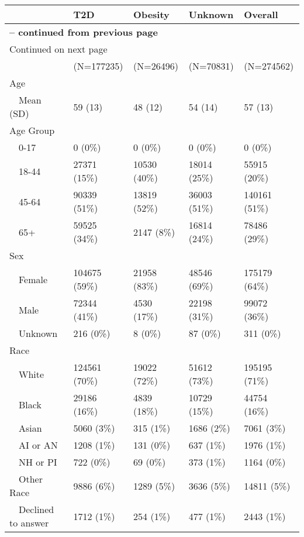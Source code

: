 \begin{longtable}{p{}p{}p{}p{}p{}}
   & T2D & Obesity & Unknown & Overall \\ 
  \hline 
\endfirsthead 
\multicolumn{5}{p{\textwidth}}{{ \bfseries \tablename \thetable{} -- continued from previous page}} \ 
\hline Feature & Type II Diabetes & Obesity & Unknown & Overall\\ \hline 
\endhead 
\hline \multicolumn{5}{p{\textwidth}}{{Continued on next page}} \\ \hline 
\endfoot 
\hline 
\endlastfoot 
 \hline
 & (N=177235) & (N=26496) & (N=70831) & (N=274562) \\ 
  Age &  &  &  &  \\ 
    Mean (SD) & 59 (13) & 48 (12) & 54 (14) & 57 (13) \\ 
  Age Group &  &  &  &  \\ 
    0-17 & 0 (0\%) & 0 (0\%) & 0 (0\%) & 0 (0\%) \\ 
    18-44 & 27371 (15\%) & 10530 (40\%) & 18014 (25\%) & 55915 (20\%) \\ 
    45-64 & 90339 (51\%) & 13819 (52\%) & 36003 (51\%) & 140161 (51\%) \\ 
    65+ & 59525 (34\%) & 2147 (8\%) & 16814 (24\%) & 78486 (29\%) \\ 
  Sex &  &  &  &  \\ 
    Female & 104675 (59\%) & 21958 (83\%) & 48546 (69\%) & 175179 (64\%) \\ 
    Male & 72344 (41\%) & 4530 (17\%) & 22198 (31\%) & 99072 (36\%) \\ 
    Unknown & 216 (0\%) & 8 (0\%) & 87 (0\%) & 311 (0\%) \\ 
  Race &  &  &  &  \\ 
    White & 124561 (70\%) & 19022 (72\%) & 51612 (73\%) & 195195 (71\%) \\ 
    Black & 29186 (16\%) & 4839 (18\%) & 10729 (15\%) & 44754 (16\%) \\ 
    Asian & 5060 (3\%) & 315 (1\%) & 1686 (2\%) & 7061 (3\%) \\ 
    AI or AN & 1208 (1\%) & 131 (0\%) & 637 (1\%) & 1976 (1\%) \\ 
    NH or PI & 722 (0\%) & 69 (0\%) & 373 (1\%) & 1164 (0\%) \\ 
    Other Race & 9886 (6\%) & 1289 (5\%) & 3636 (5\%) & 14811 (5\%) \\ 
    Declined to answer & 1712 (1\%) & 254 (1\%) & 477 (1\%) & 2443 (1\%) \\ 

\end{longtable}
